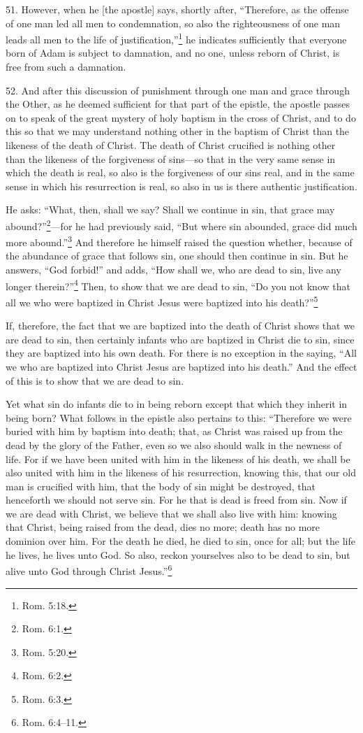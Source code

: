 51. However, when he [the apostle] says, shortly after, ``Therefore, as the offense of one man led all men to condemnation, so also the righteousness of one man leads all men to the life of justification,''\footnote{Rom. 5:18.} he indicates sufficiently that everyone born of Adam is subject to damnation, and no one, unless reborn of Christ, is free from such a damnation.

52. And after this discussion of punishment through one man and grace through the Other, as he deemed sufficient for that part of the epistle, the apostle passes on to speak of the great mystery of holy baptism in the cross of Christ, and to do this so that we may understand nothing other in the baptism of Christ than the likeness of the death of Christ. The death of Christ crucified is nothing other than the likeness of the forgiveness of sins—so that in the very same sense in which the death is real, so also is the forgiveness of our sins real, and in the same sense in which his resurrection is real, so also in us is there authentic justification.

He asks: ``What, then, shall we say? Shall we continue in sin, that grace may abound?''\footnote{Rom. 6:1.}—for he had previously said, ``But where sin abounded, grace did much more abound.''\footnote{Rom. 5:20.} And therefore he himself raised the question whether, because of the abundance of grace that follows sin, one should then continue in sin. But he answers, ``God forbid!'' and adds, ``How shall we, who are dead to sin, live any longer therein?''\footnote{Rom. 6:2.} Then, to show that we are dead to sin, ``Do you not know that all we who were baptized in Christ Jesus were baptized into his death?''\footnote{Rom. 6:3.}

If, therefore, the fact that we are baptized into the death of Christ shows that we are dead to sin, then certainly infants who are baptized in Christ die to sin, since they are baptized into his own death. For there is no exception in the saying, ``All we who are baptized into Christ Jesus are baptized into his death.'' And the effect of this is to show that we are dead to sin.

Yet what sin do infants die to in being reborn except that which they inherit in being born? What follows in the epistle also pertains to this: ``Therefore we were buried with him by baptism into death; that, as Christ was raised up from the dead by the glory of the Father, even so we also should walk in the newness of life. For if we have been united with him in the likeness of his death, we shall be also united with him in the likeness of his resurrection, knowing this, that our old man is crucified with him, that the body of sin might be destroyed, that henceforth we should not serve sin. For he that is dead is freed from sin. Now if we are dead with Christ, we believe that we shall also live with him: knowing that Christ, being raised from the dead, dies no more; death has no more dominion over him. For the death he died, he died to sin, once for all; but the life he lives, he lives unto God. So also, reckon yourselves also to be dead to sin, but alive unto God through Christ Jesus.''\footnote{Rom. 6:4–11.}

